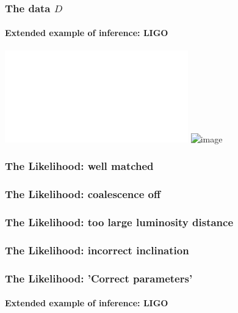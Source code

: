 \documentclass[%
]{beamer}
\begin{document}
\begin{frame}
    \frametitle{The data $D$}
    \framesubtitle{Extended example of inference: LIGO}
    \includegraphics<1>[width=\textwidth]{./figures/ligo_data.pdf}
    \includegraphics<2>[width=\textwidth]{./figures/ligo_actual.png}
\end{frame}

\begin{frame}
    \frametitle<1>{The Likelihood: well matched}
    \frametitle<2>{The Likelihood: coalescence off}
    \frametitle<3>{The Likelihood: too large luminosity distance}
    \frametitle<4>{The Likelihood: incorrect inclination}
    \frametitle<5>{The Likelihood: 'Correct parameters'}
    \framesubtitle{Extended example of inference: LIGO}

\end{frame}
\end{document}
